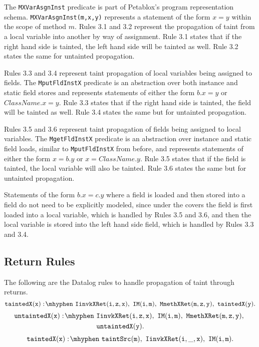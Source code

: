 The \texttt{MXVarAsgnInst} predicate is part of Petablox's program representation schema. \texttt{MXVarAsgnInst(m,x,y)} represents a statement of the form $x = y$ within the scope of method $m$. Rules 3.1 and 3.2 represent the propagation of taint from a local variable into another by way of assignment. Rule 3.1 states that if the right hand side is tainted, the left hand side will be tainted as well. Rule 3.2 states the same for untainted propagation.

Rules 3.3 and 3.4 represent taint propagation of local variables being assigned to fields. The \texttt{MputFldInstX} predicate is an abstraction over both instance and static field stores and represents statements of either the form $b.x = y$ or $ClassName.x = y$. Rule 3.3 states that if the right hand side is tainted, the field will be tainted as well. Rule 3.4 states the same but for untainted propagation.

Rules 3.5 and 3.6 represent taint propagation of fields being assigned to local variables. The \texttt{MgetFldInstX} predicate is an abstraction over instance and static field loads, similar to \texttt{MputFldInstX} from before, and represents statements of either the form $x = b.y$ or $x = ClassName.y$. Rule 3.5 states that if the field is tainted, the local variable will also be tainted. Rule 3.6 states the same but for untainted propagation.

Statements of the form $b.x = c.y$ where a field is loaded and then stored into a field do not need to be explicitly modeled, since under the covers the field is first loaded into a local variable, which is handled by Rules 3.5 and 3.6, and then the local variable is stored into the left hand side field, which is handled by Rules 3.3 and 3.4.
\subsection{Return Rules}
The following are the Datalog rules to handle propagation of taint through returns.
\begin{equation}
  \mathtt{taintedX(x) \is IinvkXRet(i,z,x) \also IM(i,m) \also  MmethXRet(m,z,y) \also taintedX(y).}
\end{equation}
\begin{equation}
  \begin{split}
    \mathtt{untaintedX(x) \is} & \mathtt{IinvkXRet(i,z,x) \also IM(i,m) \also
      MmethXRet(m,z,y) \also} \\
    & \mathtt{ untaintedX(y).} \\
  \end{split}
\end{equation}
\begin{equation}
  \mathtt{taintedX(x) \is taintSrc(m) \also IinvkXRet(i,\_,x) \also IM(i,m).}
\end{equation}

